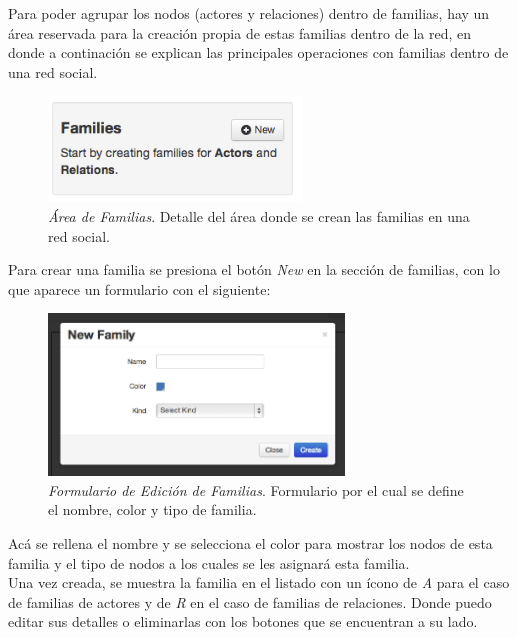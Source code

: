 Para poder agrupar los nodos (actores y relaciones) dentro de familias, hay un área reservada para la creación propia de estas familias dentro de la red, en donde a continación se explican las principales operaciones con familias dentro de una red social.\\

\begin{figure}[H]
  \centering
  \includegraphics[width=0.6\textwidth]{images/area_familias.png}
  \caption[Área de Familias]{\emph{Área de Familias}. Detalle del área donde se crean las familias en una red social.}
  \label{area_familias}
\end{figure}

Para crear una familia se presiona el botón \emph{New} en la sección de familias, con lo que aparece un formulario con el siguiente:

\begin{figure}[H]
  \centering
  \includegraphics[width=0.7\textwidth]{images/edicion_familias.png}
  \caption[Formulario de Edición de Familias]{\emph{Formulario de Edición de Familias}. Formulario por el cual se define el nombre, color y tipo de familia.}
  \label{edicion_familias}
\end{figure}

Acá se rellena el nombre y se selecciona el color para mostrar los nodos de esta familia y el tipo de nodos a los cuales se les asignará esta familia.\\

Una vez creada, se muestra la familia en el listado con un ícono de \emph{A} para el caso de familias de actores y de \emph{R} en el caso de familias de relaciones. Donde puedo editar sus detalles o eliminarlas con los botones que se encuentran a su lado.


